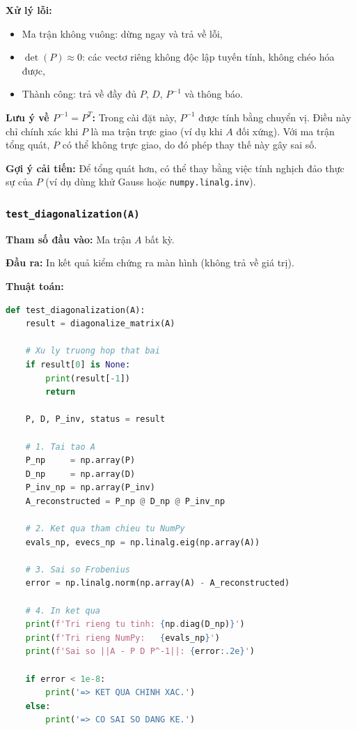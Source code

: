 \documentclass[a4paper,12pt]{report}
\begin{document}
\textbf{Xử lý lỗi:}
\begin{itemize}
  \item Ma trận không vuông: dừng ngay và trả về lỗi,
  \item $\det(P) \approx 0$: các vectơ riêng không độc lập tuyến tính, không chéo hóa được,
  \item Thành công: trả về đầy đủ $P$, $D$, $P^{-1}$ và thông báo.
\end{itemize}

\textbf{Lưu ý về $P^{-1} = P^T$:} Trong cài đặt này, $P^{-1}$ được tính bằng chuyển vị. Điều này chỉ chính xác khi $P$ là ma trận trực giao (ví dụ khi $A$ đối xứng). Với ma trận tổng quát, $P$ có thể không trực giao, do đó phép thay thế này gây sai số.

\smallskip

\textbf{Gợi ý cải tiến:} Để tổng quát hơn, có thể thay bằng việc tính nghịch đảo thực sự của $P$ (ví dụ dùng khử Gauss hoặc \texttt{numpy.linalg.inv}).

\subsubsection*{\texttt{test\_diagonalization(A)}}

\smallskip

\textbf{Tham số đầu vào:} Ma trận $A$ bất kỳ.

\smallskip

\textbf{Đầu ra:} In kết quả kiểm chứng ra màn hình (không trả về giá trị).

\smallskip

\textbf{Thuật toán:}

\begin{lstlisting}[language=Python, caption={Kiểm chứng chéo hóa}]
def test_diagonalization(A):
    result = diagonalize_matrix(A)

    # Xu ly truong hop that bai
    if result[0] is None:
        print(result[-1])
        return

    P, D, P_inv, status = result

    # 1. Tai tao A
    P_np     = np.array(P)
    D_np     = np.array(D)
    P_inv_np = np.array(P_inv)
    A_reconstructed = P_np @ D_np @ P_inv_np

    # 2. Ket qua tham chieu tu NumPy
    evals_np, evecs_np = np.linalg.eig(np.array(A))

    # 3. Sai so Frobenius
    error = np.linalg.norm(np.array(A) - A_reconstructed)

    # 4. In ket qua
    print(f'Tri rieng tu tinh: {np.diag(D_np)}')
    print(f'Tri rieng NumPy:   {evals_np}')
    print(f'Sai so ||A - P D P^-1||: {error:.2e}')

    if error < 1e-8:
        print('=> KET QUA CHINH XAC.')
    else:
        print('=> CO SAI SO DANG KE.')
\end{lstlisting}
\end{document}
